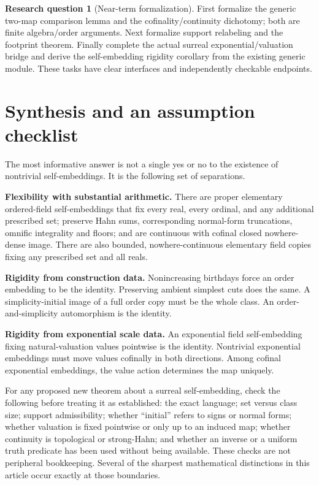 \documentclass[11pt,a4paper]{article}
\numberwithin{equation}{section}
\theoremstyle{plain}
\theoremstyle{definition}
\newtheorem{question}[theorem]{Research question}
\theoremstyle{remark}
\begin{document}
\begin{question}[Near-term formalization]
First formalize the generic two-map comparison lemma and the
cofinality/continuity dichotomy; both are finite algebra/order arguments.
Next formalize support relabeling and the footprint theorem. Finally
complete the actual surreal exponential/valuation bridge and derive the
self-embedding rigidity corollary from the existing generic module.
These tasks have clear interfaces and independently checkable endpoints.
\end{question}

\section{Synthesis and an assumption checklist}\label{sse:sec:conclusion}

The most informative answer is not a single yes or no to the existence of
nontrivial self-embeddings. It is the following set of separations.

\begin{overview}
\textbf{Flexibility with substantial arithmetic.}
There are proper elementary ordered-field self-embeddings that fix every
real, every ordinal, and any additional prescribed set; preserve Hahn
sums, corresponding normal-form truncations, omnific integrality and
floors; and are continuous with cofinal closed nowhere-dense image.
There are also bounded, nowhere-continuous elementary field copies fixing
any prescribed set and all reals.

\textbf{Rigidity from construction data.}
Nonincreasing birthdays force an order embedding to be the identity.
Preserving ambient simplest cuts does the same. A simplicity-initial
image of a full order copy must be the whole class. An order-and-simplicity
automorphism is the identity.

\textbf{Rigidity from exponential scale data.}
An exponential field self-embedding fixing natural-valuation values
pointwise is the identity. Nontrivial exponential embeddings must move
values cofinally in both directions. Among cofinal exponential embeddings,
the value action determines the map uniquely.
\end{overview}

For any proposed new theorem about a surreal self-embedding, check the
following before treating it as established: the exact language; set versus
class size; support admissibility; whether ``initial'' refers to signs or
normal forms; whether valuation is fixed pointwise or only up to an induced
map; whether continuity is topological or strong-Hahn; and whether an
inverse or a uniform truth predicate has been used without being available.
These checks are not peripheral bookkeeping. Several of the sharpest
mathematical distinctions in this article occur exactly at those boundaries.
\end{document}

